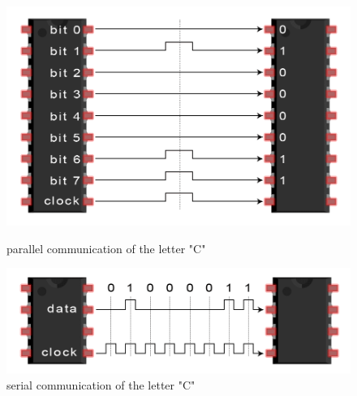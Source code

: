 \documentclass[svgnames]{article}
\begin{document}
	\begin{figure}[ht]
		\centering
		\begin{minipage}[c]{0.4\textwidth}
			\includegraphics[width=\textwidth]{pictures/SPIparallel}
			\caption{parallel communication of the letter "C" \cite{spiprotocol}}
			\label{parallel}
		\end{minipage}
		\hfill
		\begin{minipage}[c]{0.4\textwidth}
			\includegraphics[width=\textwidth]{pictures/SPIserial}
			\caption{serial communication of the letter "C" \cite{spiprotocol}}
			\label{serial}
		\end{minipage}
	\end{figure}
	
\end{document}
